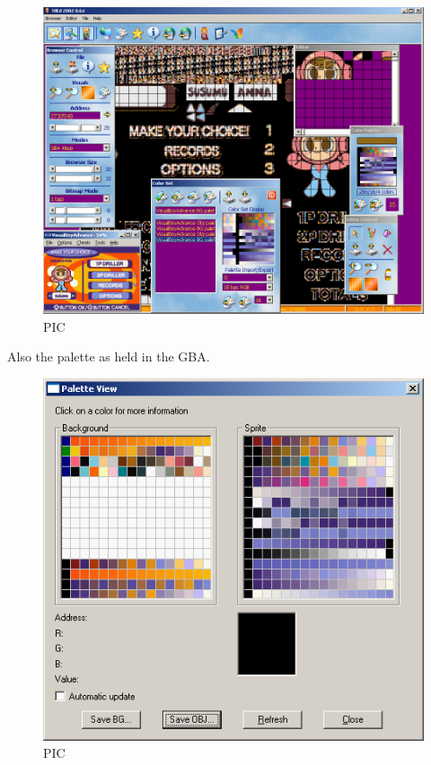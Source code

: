 \documentclass[
]{book}
\begin{document}
\begin{figure}
\centering
\includegraphics{images/13_home_fast6191_romhackingguide_unrenamed_file___hackingguidetileeeditorsshowcasetiled2002_1.png}
\caption{PIC}
\end{figure}

Also the palette as held in the GBA.

\begin{figure}
\centering
\includegraphics{images/14_home_fast6191_romhackingguide_unrenamed_file___detileeeditorsshowcasetiled2002VBApalette_1.png}
\caption{PIC}
\end{figure}
\end{document}
